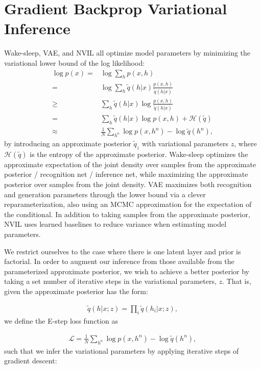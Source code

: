 \documentclass[preprint, twocolumn]{article}
\newcommand{\LL}[0]{\mathcal{L}}
\newcommand{\HH}[0]{\mathcal{H}}
\begin{document}
\section{Gradient Backprop Variational Inference}
Wake-sleep, VAE, and NVIL all optimize model parameters by minimizing the variational lower bound of the log likelihood:
\begin{align}
    \label{eq:approx_logp}
    \log p(x) =& \log \sum_{h} p(x, h) \nonumber \\
    =& \log \sum_h \tilde{q}(h|x) \frac{p(x, h)}{\tilde{q}(h|x)} \nonumber \\
    \geq& \sum_h \tilde{q}(h|x) \log \frac{p(x, h)}{\tilde{q}(h|x)} \nonumber \\
    =& \sum_h \tilde{q}(h|x) \log p(x,h) + \HH(\tilde{q}) \nonumber \\
    \approx& \frac{1}{N} \sum_{h^n} \log p(x, h^n) - \log
    \tilde{q}(h^n),
\end{align}
by introducing an approximate posterior $\tilde{q}_z$ with variational parameters $z$, where $\HH(\tilde{q})$ is the entropy of the approximate posterior.  Wake-sleep optimizes the approximate expectation of the joint density over samples from the approximate posterior / recognition net / inference net, while maximizing the approximate posterior over samples from the joint density. VAE maximizes both recognition and generation parameters through the lower bound via a clever reparameterization, also using an MCMC approximation for the expectation of the conditional. In addition to taking samples from the approximate posterior, NVIL uses learned baselines to reduce variance when estimating model parameters.

We restrict ourselves to the case where there is one latent layer and prior is factorial. In order to augment our inference from those available from the parameterized approximate posterior, we wish to achieve a better posterior by taking a set number of iterative steps in the variational parameters, $z$. That is, given the approximate posterior has the form:

\begin{align}
\tilde{q}(h|x; z) = \prod_i \tilde{q}(h_i|x; z),
\end{align}
we define the E-step loss function as

\begin{align}
\LL = \frac{1}{N} \sum_{h^n} \log p(x, h^n) - \log \tilde{q}(h^n),
\end{align}
such that we infer the variational parameters by applying iterative steps of gradient descent:
\end{document}
